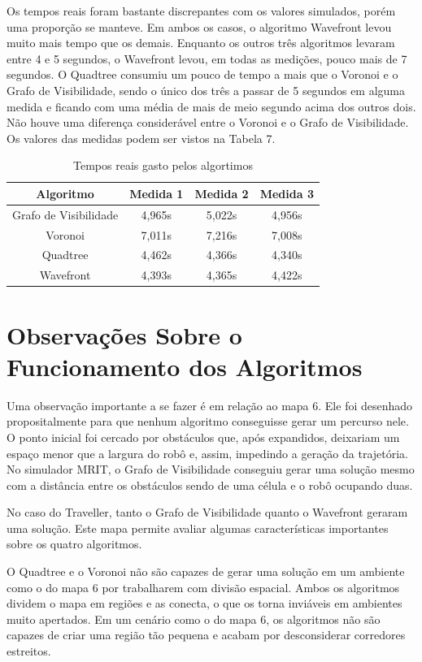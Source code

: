 Os tempos reais foram bastante discrepantes com os valores simulados, porém uma proporção se manteve. Em ambos os casos, o algoritmo Wavefront levou muito mais tempo que os demais. Enquanto os outros três algoritmos levaram entre 4 e 5 segundos, o Wavefront levou, em todas as medições, pouco mais de 7 segundos. O Quadtree consumiu um pouco de tempo a mais que o Voronoi e o Grafo de Visibilidade, sendo o único dos três a passar de 5 segundos em alguma medida e ficando com uma média de mais de meio segundo acima dos outros dois. Não houve uma diferença considerável entre o Voronoi e o Grafo de Visibilidade. Os valores das medidas podem ser vistos na Tabela 7.

\begin{table}[h]
	\centering
	\label{tab07}
	\caption{Tempos reais gasto pelos algortimos}
	\begin{tabular}{c|c|c|c}
		\toprule
		\textbf{Algoritmo} & \textbf{Medida 1} & \textbf{Medida 2} & \textbf{Medida 3} \\
		\midrule
Grafo de Visibilidade & 4,965s  & 5,022s & 4,956s \\
Voronoi 				  & 7,011s  & 7,216s & 7,008s \\
Quadtree				  & 4,462s  & 4,366s & 4,340s \\
Wavefront             & 4,393s  & 4,365s & 4,422s  \\
		\bottomrule
	\end{tabular}
\end{table}

\section{Observações Sobre o Funcionamento dos Algoritmos}

Uma observação importante a se fazer é em relação ao mapa 6. Ele foi desenhado propositalmente para que nenhum algoritmo conseguisse gerar um percurso nele. O ponto inicial foi cercado por obstáculos que, após expandidos, deixariam um espaço menor que a largura do robô e, assim, impedindo a geração da trajetória. No simulador MRIT, o Grafo de Visibilidade conseguiu gerar uma solução mesmo com a distância entre os obstáculos sendo de uma célula e o robô ocupando duas.

No caso do Traveller, tanto o Grafo de Visibilidade quanto o Wavefront geraram uma solução. Este mapa permite avaliar algumas características importantes sobre os quatro algoritmos.

O Quadtree e o Voronoi não são capazes de gerar uma solução em um ambiente como o do mapa 6 por trabalharem com divisão espacial. Ambos os algoritmos dividem o mapa em regiões e as conecta, o que os torna inviáveis em ambientes muito apertados. Em um cenário como o do mapa 6, os algoritmos não são capazes de criar uma região tão pequena e acabam por desconsiderar corredores estreitos.

